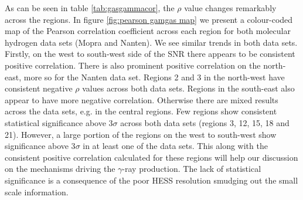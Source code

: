 \documentclass[12pt,a4paper]{article}
\begin{document}
As can be seen in table \ref{tab:gasgammacor}, the $\rho$ value changes remarkably across the regions.
In figure \ref{fig:pearson gamgas map} we present a colour-coded map of the Pearson correlation coefficient across each region for both molecular hydrogen data sets (Mopra and Nanten).
We see similar trends in both data sets. 
Firstly, on the west to south-west side of the SNR there appears to be consistent positive correlation.
There is also prominent positive correlation on the north-east, more so for the Nanten data set.
Regions 2 and 3 in the north-west have consistent negative $\rho$ values across both data sets.
Regions in the south-east also appear to have more negative correlation.
Otherwise there are mixed results across the data sets, e.g. in the central regions.
Few regions show consistent statistical significance above 3$\sigma$ across both data sets (regions 3, 12, 15, 18 and 21). 
However, a large portion of the regions on the west to south-west show significance above 3$\sigma$ in at least one of the data sets.
This along with the consistent positive correlation calculated for these regions will help our discussion on the mechanisms driving the $\gamma$-ray production. 
The lack of statistical significance is a consequence of the poor HESS resolution smudging out the small scale information.
\end{document}
